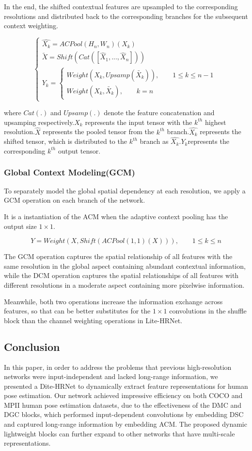 \documentclass[11pt]{article}
\begin{document}
In the end, the shifted contextual features are upsampled to the corresponding resolutions and distributed back to the corresponding branches for the subsequent context weighting.

$$\left\{\begin{array}{l}
	\hat{X_k} = ACPool(H_n, W_n)(X_k)\\
	\tilde{X} = Shift(Cat([\hat{X}_1,...,\hat{X}_n]))\\
	Y_k = \left\{\begin{array}{l}
		Weight(X_k, Upsamp(\tilde{X_k})), \qquad 1\leq k\leq n-1\\
		Weight(X_k, \tilde{X_k}), \qquad k=n
	\end{array}\right.
\end{array}\right.$$

where $Cat(.)$ and $Upsamp(.)$ denote the feature concatenation and upsamping respectively.$X_k$ represents the input tensor with the $k^{th}$ highest resolution.$\hat{X}$ represents the pooled tensor from the $k^{th}$ branch.$\hat{X_k}$ represents the shifted tensor, which is distributed to the $k^{th}$ branch as $\hat{X_k}$.$Y_k$represents the corresponding $k^{th}$ output tensor.

\subsubsection{Global Context Modeling(GCM)}
To separately model the global spatial dependency at each resolution, we apply a GCM operation on each branch of the network.

It is a instantiation of the ACM when the adaptive context pooling has the
output size $1 \times 1$.

$$Y = Weight(X, Shift(ACPool(1,1)(X))), \qquad 1\leq k \leq n$$

The GCM operation captures the spatial relationship of all features with the same resolution in the global aspect containing abundant contextual information, while the DCM operation captures the spatial relationships of all features with different resolutions in a moderate aspect containing more pixelwise information.

Meanwhile, both two operations increase the information exchange across features, so that can be better substitutes for the $1\times 1$ convolutions in the shuffle block than the channel weighting operations in Lite-HRNet.
\subsection{Conclusion}
In this paper, in order to address the problems that previous high-resolution networks were input-independent and lacked long-range information, we presented a Dite-HRNet to dynamically extract feature representations for human pose estimation. Our network achieved impressive efficiency on both COCO and MPII human pose estimation datasets, due to the effectiveness of the DMC and DGC blocks, which performed input-dependent convolutions by embedding DSC and captured long-range information by embedding ACM. The proposed dynamic lightweight blocks can further expand to other networks that have multi-scale representations.
\end{document}
